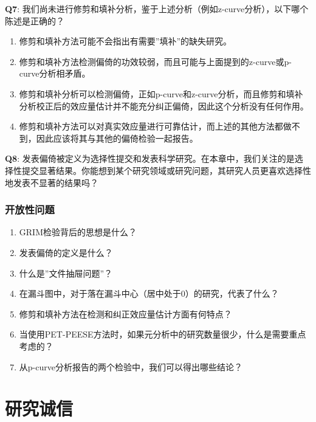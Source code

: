 \documentclass[
  letterpaper,
  DIV=11,
  numbers=noendperiod]{scrreprt}
\providecommand{\tightlist}{%
  \setlength{\itemsep}{0pt}\setlength{\parskip}{0pt}}\usepackage{longtable,booktabs,array}
\begin{document}
\textbf{Q7}:
我们尚未进行修剪和填补分析，鉴于上述分析（例如z-curve分析），以下哪个陈述是正确的？

\begin{enumerate}
\def\labelenumi{\Alph{enumi})}
\tightlist
\item
  修剪和填补方法可能不会指出有需要''填补''的缺失研究。
\item
  修剪和填补方法检测偏倚的功效较弱，而且可能与上面提到的z-curve或p-curve分析相矛盾。
\item
  修剪和填补分析可以检测偏倚，正如p-curve和z-curve分析，而且修剪和填补分析校正后的效应量估计并不能充分纠正偏倚，因此这个分析没有任何作用。
\item
  修剪和填补方法可以对真实效应量进行可靠估计，而上述的其他方法都做不到，因此应该将其与其他的偏倚检验一起报告。
\end{enumerate}

\textbf{Q8}:
发表偏倚被定义为选择性提交和发表科学研究。在本章中，我们关注的是选择性提交显著结果。你能想到某个研究领域或研究问题，其研究人员更喜欢选择性地发表不显著的结果吗？

\hypertarget{ux5f00ux653eux6027ux95eeux9898-2}{%
\subsection{开放性问题}\label{ux5f00ux653eux6027ux95eeux9898-2}}

\begin{enumerate}
\def\labelenumi{\arabic{enumi}.}
\item
  GRIM检验背后的思想是什么？
\item
  发表偏倚的定义是什么？
\item
  什么是''文件抽屉问题''？
\item
  在漏斗图中，对于落在漏斗中心（居中处于0）的研究，代表了什么？
\item
  修剪和填补方法在检测和纠正效应量估计方面有何特点？
\item
  当使用PET-PEESE方法时，如果元分析中的研究数量很少，什么是需要重点考虑的？
\item
  从p-curve分析报告的两个检验中，我们可以得出哪些结论？
\end{enumerate}


\hypertarget{sec-integrity}{%
\chapter{研究诚信}\label{sec-integrity}}
\end{document}
